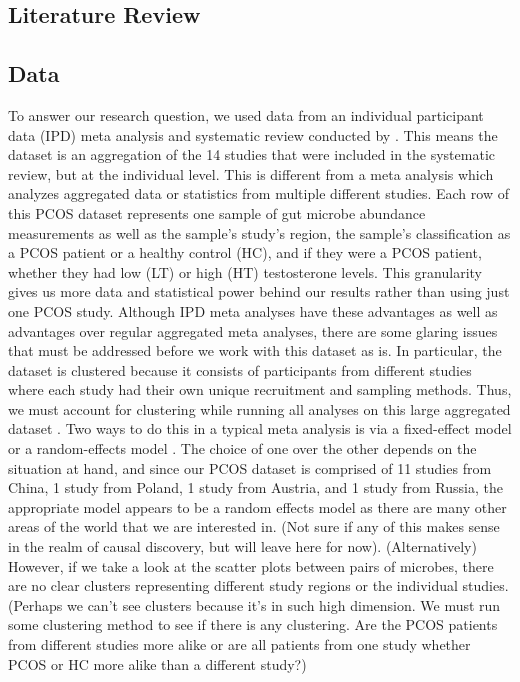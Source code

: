 \documentclass[12pt,letterpaper]{article}
\begin{document}
\subsection{Literature Review}

\subsection{Data}
To answer our research question, we used data from an individual participant data (IPD) meta analysis and systematic review conducted by \citep{yang2024pcos}. This means the dataset is an aggregation of the 14 studies that were included in the systematic review, but at the individual level. This is different from a meta analysis which analyzes aggregated data or statistics from multiple different studies. Each row of this PCOS dataset represents one sample of gut microbe abundance measurements as well as the sample's study's region, the sample's classification as a PCOS patient or a healthy control (HC), and if they were a PCOS patient, whether they had low (LT) or high (HT) testosterone levels. This granularity gives us more data and statistical power behind our results rather than using just one PCOS study. Although IPD meta analyses have these advantages as well as advantages over regular aggregated meta analyses, there are some glaring issues that must be addressed before we work with this dataset as is. In particular, the dataset is clustered because it consists of participants from different studies where each study had their own unique recruitment and sampling methods. Thus, we must account for clustering while running all analyses on this large aggregated dataset \citep{riley2010ipdma}. Two ways to do this in a typical meta analysis is via a fixed-effect model or a random-effects model \citep{dettori2022fixedrandomeffect}. The choice of one over the other depends on the situation at hand, and since our PCOS dataset is comprised of 11 studies from China, 1 study from Poland, 1 study from Austria, and 1 study from Russia, the appropriate model appears to be a random effects model as there are many other areas of the world that we are interested in. (Not sure if any of this makes sense in the realm of causal discovery, but will leave here for now). (Alternatively) However, if we take a look at the scatter plots between pairs of microbes, there are no clear clusters representing different study regions or the individual studies. (Perhaps we can't see clusters because it's in such high dimension. We must run some clustering method to see if there is any clustering. Are the PCOS patients from different studies more alike or are all patients from one study whether PCOS or HC more alike than a different study?)
\end{document}
